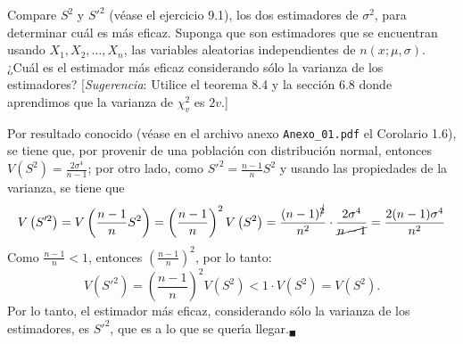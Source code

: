 \begin{enunciado}
 Compare $S^2$ y $S'^2$ (v\'ease el ejercicio 9.1), los dos estimadores de $\sigma^2$, para determinar cu\'al es m\'as eficaz. Suponga que son estimadores que se encuentran usando $X_1, X_2, \ldots, X_n$, las variables aleatorias independientes de $n(x;\mu,\sigma)$. ¿Cu\'al es el estimador m\'as eficaz considerando s\'olo la varianza de los estimadores? [\textit{Sugerencia}: Utilice el teorema 8.4 y la secci\'on 6.8 donde aprendimos que la varianza de $\chi_v^2$ es $2v$.]
\end{enunciado}

\begin{solucion}
 Por resultado conocido (v\'ease en el archivo anexo \texttt{Anexo\_01.pdf} el Corolario 1.6), se tiene que, por provenir de una poblaci\'on con distribuci\'on normal, entonces $V\left( S^2 \right) = \frac{2\sigma^4}{n-1}$; por otro lado, como $S'^2 = \frac{n-1}{n}S^2$ y usando las propiedades de la varianza, se tiene que
 \begin{equation*}
  V\left( S'^2 \right) = V\left( \frac{n-1}{n} S^2 \right) = \left( \frac{n-1}{n} \right)^2 V\left( S^2 \right) = \frac{(n-1)^{\cancel{2}}}{n^2} \cdot \frac{2\sigma^4}{\cancel{n-1}} = \frac{2(n-1)\sigma^4}{n^2}
 \end{equation*}
 Como $\frac{n-1}{n} < 1$, entonces $\left( \frac{n-1}{n} \right)^2$, por lo tanto:
 \begin{equation*}
  V\left( S'^2 \right) = \left( \frac{n-1}{n} \right)^2 V\left( S^2 \right) < 1\cdot V\left( S^2 \right) = V\left( S^2 \right).
 \end{equation*}
 Por lo tanto, el estimador m\'as eficaz, considerando s\'olo la varianza de los estimadores, es $S'^2$, que es a lo que se quer\'{\i}a llegar.${}_{\blacksquare}$
\end{solucion}
